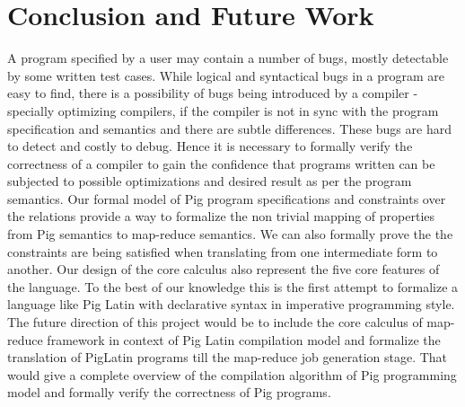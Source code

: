 \section{Conclusion and Future Work}
\label{sec:conclusion}

A program specified by a user may contain a number of bugs, mostly detectable by some written test cases. While logical and syntactical bugs in a program are easy to find, there is a possibility of bugs being introduced by a compiler - specially optimizing compilers, if the compiler is not in sync with the program specification and semantics and there are subtle differences. These bugs are hard to detect and costly to debug. Hence it is necessary to formally verify the correctness of a compiler to gain the confidence that programs written can be subjected to possible optimizations and desired result as per the program semantics. 
Our formal model of Pig program specifications and constraints over the relations provide a way to formalize the non trivial mapping of properties from Pig semantics to map-reduce semantics. We can also formally prove the the constraints are being satisfied when translating from one intermediate form to another. Our design of the core calculus also represent the five core features of the language. To the best of our knowledge this is the first attempt to formalize a language like Pig Latin with declarative syntax in imperative programming style. \\
The future direction of this project would be to include the core calculus of map-reduce framework in context of Pig Latin compilation model and formalize the translation of PigLatin programs till the map-reduce job generation stage. That would give a complete overview of the compilation algorithm of Pig programming model and formally verify the correctness of Pig programs.

